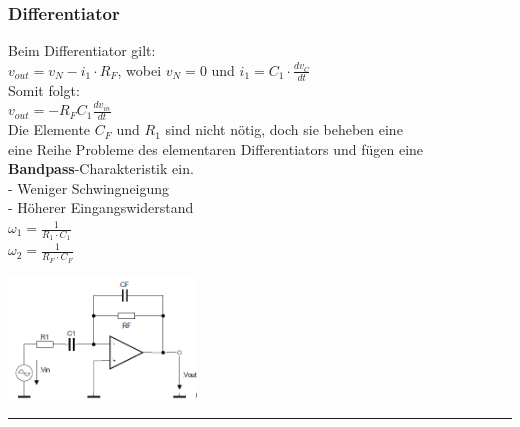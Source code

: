 		\begin{minipage}[c]{12cm}        
        \subsubsection{Differentiator}
           	Beim Differentiator gilt: \\ 
           	$v_{out}=v_N-i_1 \cdot R_F$, wobei $v_N=0$ und $i_1=C_1 \cdot \frac{dv_C}{dt}$\\
           	Somit folgt:\\
           	$v_{out}=-R_FC_1 \frac{dv_{in}}{dt}$\\
           		
           	Die Elemente $C_F$ und $R_1$ sind nicht nötig, doch sie beheben eine\\
           	eine Reihe Probleme des elementaren Differentiators und fügen eine \\
           	{\bf Bandpass}-Charakteristik ein. \\
           	- Weniger Schwingneigung \\
           	- Höherer Eingangswiderstand \\
           	$\omega_1 = \frac{1}{R_1 \cdot C_1}$\\
           	$\omega_2 = \frac{1}{R_F \cdot C_F}$\\      
        \end{minipage}
		\begin{minipage}[c]{5cm}
        	\includegraphics[width=5cm]{./images/differentiator.png}
        \end{minipage}
\hrule

